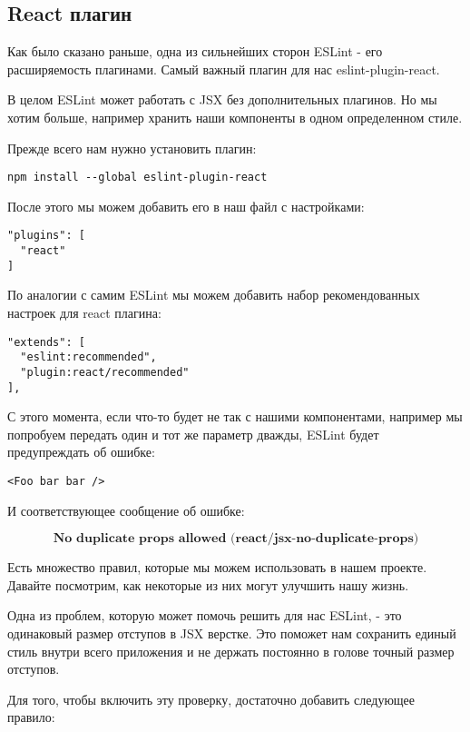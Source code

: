 \subsection*{React плагин}

Как было сказано раньше, одна из сильнейших сторон ESLint - его расширяемость плагинами. Самый важный плагин для нас eslint-plugin-react.

В целом ESLint может работать с JSX без дополнительных плагинов. Но мы хотим больше, например хранить наши компоненты в одном определенном стиле.

Прежде всего нам нужно установить плагин:

\begin{lstlisting}
npm install --global eslint-plugin-react
\end{lstlisting}
   
После этого мы можем добавить его в наш файл с настройками:

\begin{lstlisting}
"plugins": [
  "react"
]
\end{lstlisting}

По аналогии с самим ESLint мы можем добавить набор рекомендованных настроек для react плагина:

\begin{lstlisting}
"extends": [
  "eslint:recommended",
  "plugin:react/recommended"
],
\end{lstlisting}

С этого момента, если что-то будет не так с нашими компонентами, например мы попробуем передать один и тот же параметр дважды, ESLint будет предупреждать об ошибке:

\begin{lstlisting}
<Foo bar bar />
\end{lstlisting}

И соответствующее сообщение об ошибке:

$$
\textbf{No duplicate props allowed (react/jsx-no-duplicate-props)}
$$

Есть множество правил, которые мы можем использовать в нашем проекте. Давайте посмотрим, как некоторые из них могут улучшить нашу жизнь.

Одна из проблем, которую может помочь решить для нас ESLint, - это одинаковый размер отступов в JSX верстке. Это поможет нам сохранить единый стиль внутри всего приложения и не держать постоянно в голове точный размер отступов.

Для того, чтобы включить эту проверку, достаточно добавить следующее правило:

